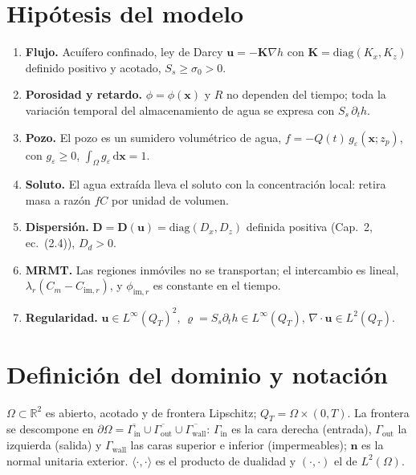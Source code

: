 \documentclass[11pt]{article}
\numberwithin{equation}{section}
\theoremstyle{remark}
\newcommand{\bu}{\mathbf{u}}
\newcommand{\bK}{\mathbf{K}}
\newcommand{\bD}{\mathbf{D}}
\newcommand{\bn}{\mathbf{n}}
\newcommand{\bx}{\mathbf{x}}
\newcommand{\geps}{g_\varepsilon}
\newcommand{\im}{\mathrm{im}}
\newcommand{\vr}{\varrho}              %
\newcommand{\dd}{\,\mathrm{d}}
\newcommand{\Gin}{\Gamma_{\mathrm{in}}}
\newcommand{\Gout}{\Gamma_{\mathrm{out}}}
\newcommand{\Gwall}{\Gamma_{\mathrm{wall}}}
\begin{document}
\section{Hip\'otesis del modelo}

\begin{enumerate}[label=(H\arabic*)]
\item \textbf{Flujo.} Acu\'ifero confinado, ley de Darcy $\bu=-\bK\nabla h$ con
  $\bK=\mathrm{diag}(K_x,K_z)$ definido positivo y acotado, $S_s\ge\sigma_0>0$.
\item \textbf{Porosidad y retardo.} $\phi=\phi(\bx)$ y $R$ no dependen del tiempo; toda
  la variaci\'on temporal del almacenamiento de agua se expresa con $S_s\,\partial_th$.
\item \textbf{Pozo.} El pozo es un sumidero volum\'etrico de agua,
  $f=-Q(t)\,\geps(\bx;z_p)$, con $\geps\ge0$, $\int_\Omega\geps\dd\bx=1$.
\item \textbf{Soluto.} El agua extra\'ida lleva el soluto con la concentraci\'on local:
  retira masa a raz\'on $fC$ por unidad de volumen.
\item \textbf{Dispersi\'on.} $\bD=\bD(\bu)=\mathrm{diag}(D_x,D_z)$ definida positiva
  (Cap.~2, ec.~(2.4)), $D_d>0$.
\item \textbf{MRMT.} Las regiones inm\'oviles no se transportan; el intercambio es lineal,
  $\lambda_r(C_m-C_{\im,r})$, y $\phi_{\im,r}$ es constante en el tiempo.
\item \textbf{Regularidad.} $\bu\in L^\infty(Q_T)^2$, $\vr=S_s\partial_th\in L^\infty(Q_T)$,
  $\nabla\!\cdot\bu\in L^2(Q_T)$.
\end{enumerate}

\section{Definici\'on del dominio y notaci\'on}

$\Omega\subset\mathbb{R}^2$ es abierto, acotado y de frontera Lipschitz;
$Q_T=\Omega\times(0,T)$. La frontera se descompone en
$\partial\Omega=\overline{\Gin}\cup\overline{\Gout}\cup\overline{\Gwall}$:
$\Gin$ es la cara derecha (entrada), $\Gout$ la izquierda (salida) y $\Gwall$ las caras superior e inferior
(impermeables); $\bn$ es la normal unitaria exterior. $\langle\cdot,\cdot\rangle$ es el
producto de dualidad y $(\cdot,\cdot)$ el de $L^2(\Omega)$.
\end{document}
